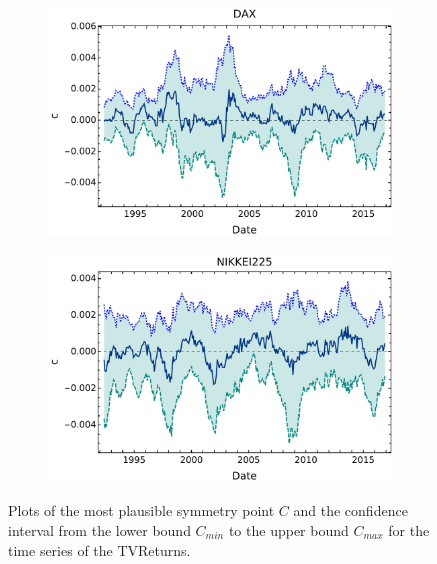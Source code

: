 \documentclass{elsarticle}
\begin{document}
\begin{figure}[h!tb]
\begin{subfigure}[b]{0.44\textwidth}
            \includegraphics[width=\textwidth]{figures/SimmTVReturns/Simetria_DAX_CL005.pdf}
            \label{fig:SymmTVReturns005DAX}
            \end{subfigure}
        \quad
        \begin{subfigure}[b]{0.44\textwidth}
            \centering 
            \includegraphics[width=\textwidth]{figures/SimmTVReturns/Simetria_NIKKEI_CL005.pdf}
            \label{fig:SymmTVReturns005Nikkei}
        \end{subfigure}
        \caption[Plots of the most plausible symmetry point $C$ and the confidence interval TReturns]
        {\small Plots of the most plausible symmetry point $C$ and the confidence interval from the lower bound $C_{min}$ to the upper bound $C_{max}$ for the time series of the TVReturns.} 
        \label{fig:SymmTVReturns005}
\end{figure}

\clearpage
\nocite{*}

\end{document}

